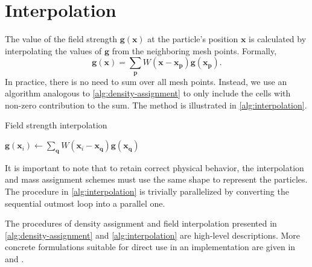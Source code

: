 \section{Interpolation}
The value of the field strength $\mathbf{g}(\mathbf{x})$ at the particle's position $\mathbf{x}$ is calculated by interpolating the values of $\mathbf{g}$ from the neighboring mesh points.
Formally,
\begin{equation*}
    \mathbf{g}(\mathbf{x}) = \sum_\mathbf{p} W(\mathbf{x} - \mathbf{x}_\mathbf{p}) \mathbf{g}(\mathbf{x}_\mathbf{p}).
\end{equation*}
In practice, there is no need to sum over all mesh points.
Instead, we use an algorithm analogous to \autoref{alg:density-assignment} to only include the cells with non-zero contribution to the sum.
The method is illustrated in \autoref{alg:interpolation}.
\begin{algorithm}
    \caption{Field strength interpolation}\label{alg:interpolation}
    \begin{algorithmic}[1]
        \State $\mathbf{g}(\mathbf{x}_i) \gets \sum_\mathbf{q} W(\mathbf{x}_i - \mathbf{x}_\mathbf{q}) \mathbf{g}(\mathbf{x}_\mathbf{q})$
        \EndFor
        \EndFor
    \end{algorithmic}
\end{algorithm}
It is important to note that to retain correct physical behavior, the interpolation and mass assignment schemes must use the same shape to represent the particles.
The procedure in \autoref{alg:interpolation} is trivially parallelized by converting the sequential outmost loop into a parallel one.

The procedures of density assignment and field interpolation presented in \autoref{alg:density-assignment} and \autoref{alg:interpolation} are high-level descriptions.
More concrete formulations suitable for direct use in an implementation are given in \cite{Hockney1988} and \cite{Kravtsov2002PM}.
